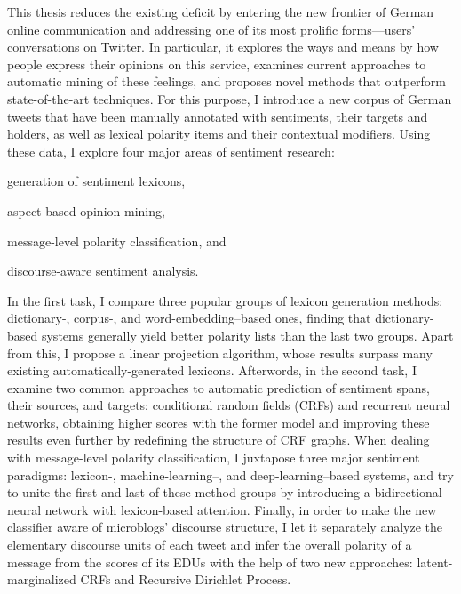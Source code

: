 \documentclass[a4paper,11pt]{article}
\begin{document}
\noindent This thesis reduces the existing deficit by entering the new
frontier of German online communication and addressing one of its most
prolific forms---users' conversations on Twitter.  In particular, it
explores the ways and means by how people express their opinions on
this service, examines current approaches to automatic mining of these
feelings, and proposes novel methods that outperform state-of-the-art
techniques.  For this purpose, I introduce a new corpus of German
tweets that have been manually annotated with sentiments, their
targets and holders, as well as lexical polarity items and their
contextual modifiers.
Using these data, I explore four major areas of sentiment research:
\begin{inparaenum}[(i)]
\item generation of sentiment lexicons,
\item aspect-based opinion mining,
\item message-level polarity classification, and
\item discourse-aware sentiment analysis.
\end{inparaenum}
In the first task, I compare three popular groups of lexicon
generation methods: dictionary-, corpus-, and word-embedding--based
ones, finding that dictionary-based systems generally yield better
polarity lists than the last two groups.  Apart from this, I propose a
linear projection algorithm, whose results surpass many existing
automatically-generated lexicons.  Afterwords, in the second task, I
examine two common approaches to automatic prediction of sentiment
spans, their sources, and targets: conditional random fields (CRFs)
and recurrent neural networks, obtaining higher scores with the former
model and improving these results even further by redefining the
structure of CRF graphs.  When dealing with message-level polarity
classification, I juxtapose three major sentiment paradigms: lexicon-,
machine-learning--, and deep-learning--based systems, and try to unite
the first and last of these method groups by introducing a
bidirectional neural network with lexicon-based attention. Finally, in
order to make the new classifier aware of microblogs' discourse
structure, I let it separately analyze the elementary discourse units
of each tweet and infer the overall polarity of a message from the
scores of its EDUs with the help of two new approaches:
latent-marginalized CRFs and Recursive Dirichlet Process.
\end{document}
